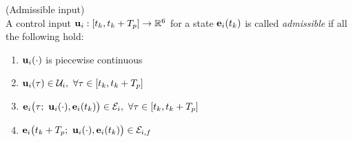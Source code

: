 \begin{bw_box}
\begin{definition} (Admissible input)\\

  A control input $\bm{\mathbf{u}}_i : [t_k, t_k + T_p] \to \mathbb{R}^6$ for a state
  $\bm{\mathbf{e}}_i(t_k)$ is called \textit{admissible} if all the following hold:

  \begin{enumerate}
    \item $\bm{\mathbf{u}}_i(\cdot)$ is piecewise continuous
    \item $\vect{u}_i(\tau) \in \mathcal{U}_i,\ \forall \tau \in [t_k, t_k + T_p]$
    \item $\vect{e}_i\big(\tau;\ \vect{u}_i(\cdot), \vect{e}_i(t_k)\big) \in \mathcal{E}_i,\ \forall \tau \in [t_k, t_k + T_p]$
    \item $\vect{e}_i\big(t_k + T_p;\ \vect{u}_i(\cdot), \vect{e}_i(t_k)\big) \in \mathcal{E}_{i,f}$
  \end{enumerate}

\end{definition}
\end{bw_box}
